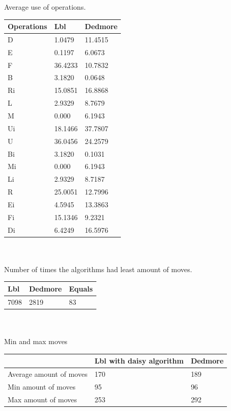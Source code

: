 \documentclass[a4paper,11pt]{kth-mag}
\begin{document}
		Average use of operations.\\
		\begin{tabular}{|l|l|l|}
		\hline
		Operations & Lbl & Dedmore \\ \hline
		D & 1.0479 & 11.4515 \\ \hline
		E & 0.1197 & 6.0673 \\ \hline
		F & 36.4233 & 10.7832 \\ \hline
		B & 3.1820 & 0.0648 \\ \hline
		Ri & 15.0851 & 16.8868 \\ \hline
		L & 2.9329 & 8.7679 \\ \hline
		M & 0.000 &	6.1943 \\ \hline
		Ui & 18.1466 & 37.7807 \\ \hline
		U & 36.0456 & 24.2579 \\ \hline
		Bi & 3.1820 & 0.1031 \\ \hline
		Mi & 0.000 & 6.1943 \\ \hline
		Li & 2.9329 & 8.7187 \\ \hline
		R & 25.0051 & 12.7996 \\ \hline
		Ei & 4.5945 & 13.3863 \\ \hline
		Fi & 15.1346 & 9.2321 \\ \hline
		Di & 6.4249 & 16.5976 \\ \hline
		\end{tabular}
		\\\\
		Number of times the algorithms had least amount of moves.\\
		\begin{tabular}{|l|l|l|}
		\hline
		Lbl & Dedmore & Equals \\ \hline
		7098 & 2819 & 83 \\ \hline
		\end{tabular}
		\\\\
		Min and max moves \\
		\begin{tabular}{|l|l|l|}
		\hline
		 & Lbl with daisy algorithm & Dedmore \\ \hline
		Average amount of moves & 170 & 189 \\ \hline 
		Min amount of moves & 95 & 96 \\ \hline
		Max amount of moves & 253 & 292 \\ \hline
		\end{tabular}		

	
\end{document}
